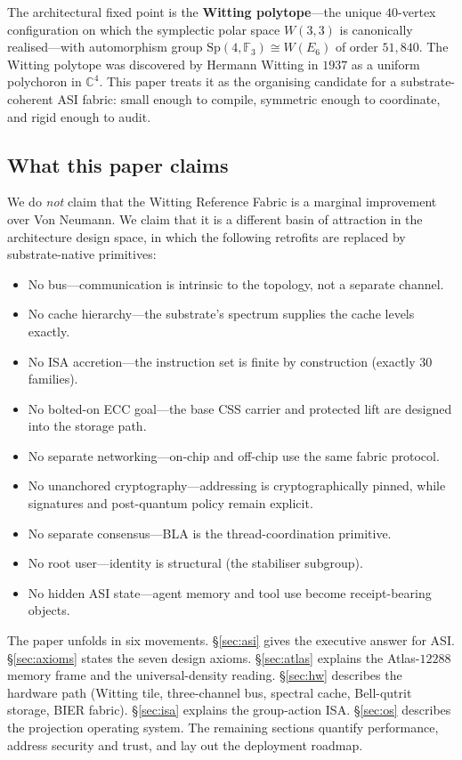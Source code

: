 \documentclass[11pt,letterpaper]{article}
\theoremstyle{remark}
\newcommand{\W}{W(3,3)}
\newcommand{\Sp}{\mathrm{Sp}}
\newcommand{\FF}{\mathbb{F}}
\newcommand{\CC}{\mathbb{C}}
\begin{document}
The architectural fixed point is the \textbf{Witting polytope}---the unique $40$-vertex
configuration on which the symplectic polar space $\W$ is canonically realised---with
automorphism group $\Sp(4,\FF_3) \cong W(E_6)$ of order $51{,}840$. The Witting polytope
was discovered by Hermann Witting in $1937$ as a uniform polychoron in $\CC^4$. This paper
treats it as the organising candidate for a substrate-coherent ASI fabric: small enough to
compile, symmetric enough to coordinate, and rigid enough to audit.

\subsection{What this paper claims}

We do \emph{not} claim that the Witting Reference Fabric is a marginal improvement over Von
Neumann. We claim that it is a different basin of attraction in the architecture design
space, in which the following retrofits are replaced by substrate-native primitives:

\begin{itemize}[leftmargin=2em,nosep]
\item No bus---communication is intrinsic to the topology, not a separate channel.
\item No cache hierarchy---the substrate's spectrum supplies the cache levels exactly.
\item No ISA accretion---the instruction set is finite by construction (exactly $30$
families).
\item No bolted-on ECC goal---the base CSS carrier and protected lift are designed into
the storage path.
\item No separate networking---on-chip and off-chip use the same fabric protocol.
\item No unanchored cryptography---addressing is cryptographically pinned, while
signatures and post-quantum policy remain explicit.
\item No separate consensus---BLA is the thread-coordination primitive.
\item No root user---identity is structural (the stabiliser subgroup).
\item No hidden ASI state---agent memory and tool use become receipt-bearing objects.
\end{itemize}

The paper unfolds in six movements. \S\ref{sec:asi} gives the executive answer for ASI.
\S\ref{sec:axioms} states the seven design axioms. \S\ref{sec:atlas} explains the
Atlas-$12288$ memory frame and the universal-density reading. \S\ref{sec:hw} describes the
hardware path (Witting tile, three-channel bus, spectral cache, Bell-qutrit storage, BIER
fabric). \S\ref{sec:isa} explains the group-action ISA. \S\ref{sec:os} describes the
projection operating system. The remaining sections quantify performance, address
security and trust, and lay out the deployment roadmap.
\end{document}
